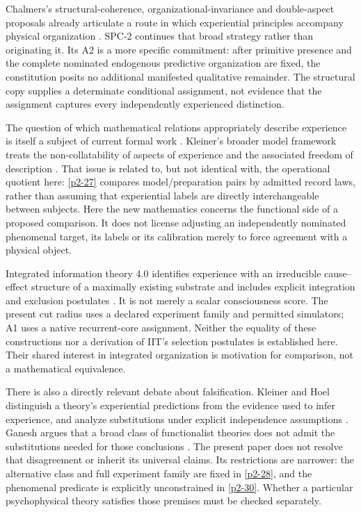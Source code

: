 Chalmers's structural-coherence, organizational-invariance and double-aspect proposals already articulate a route in which experiential principles accompany physical organization \cite{Chalmers1995}. SPC-2 continues that broad strategy rather than originating it. Its A2 is a more specific commitment: after primitive presence and the complete nominated endogenous predictive organization are fixed, the constitution posits no additional manifested qualitative remainder. The structural copy supplies a determinate conditional assignment, not evidence that the assignment captures every independently experienced distinction.

The question of which mathematical relations appropriately describe experience is itself a subject of current formal work \cite{KleinerLudwig2023}. Kleiner's broader model framework treats the non-collatability of aspects of experience and the associated freedom of description \cite{Kleiner2020}. That issue is related to, but not identical with, the operational quotient here: \cref{p2-27} compares model/preparation pairs by admitted record laws, rather than assuming that experiential labels are directly interchangeable between subjects. Here the new mathematics concerns the functional side of a proposed comparison. It does not license adjusting an independently nominated phenomenal target, its labels or its calibration merely to force agreement with a physical object.

Integrated information theory 4.0 identifies experience with an irreducible cause--effect structure of a maximally existing substrate and includes explicit integration and exclusion postulates \cite{AlbantakisEtAl2023}. It is not merely a scalar consciousness score. The present cut radius uses a declared experiment family and permitted simulators; A1 uses a native recurrent-core assignment. Neither the equality of these constructions nor a derivation of IIT's selection postulates is established here. Their shared interest in integrated organization is motivation for comparison, not a mathematical equivalence.

There is also a directly relevant debate about falsification. Kleiner and Hoel distinguish a theory's experiential predictions from the evidence used to infer experience, and analyze substitutions under explicit independence assumptions \cite{KleinerHoel2021}. Ganesh argues that a broad class of functionalist theories does not admit the substitutions needed for those conclusions \cite{Ganesh2021}. The present paper does not resolve that disagreement or inherit its universal claims. Its restrictions are narrower: the alternative class and full experiment family are fixed in \cref{p2-28}, and the phenomenal predicate is explicitly unconstrained in \cref{p2-30}. Whether a particular psychophysical theory satisfies those premises must be checked separately.

